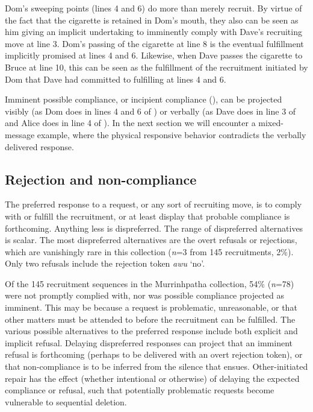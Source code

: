 \documentclass[output=paper,nonflat,colorlinks,citecolor=brown]{langsci/langscibook}
\begin{document}
Dom’s sweeping points (lines 4 and 6) do more than merely recruit. By virtue of the fact that the cigarette is retained in Dom’s mouth, they also can be seen as him giving an implicit undertaking to imminently comply with Dave’s recruiting move at line 3. %
Dom’s passing of the cigarette at line 8 is the eventual fulfillment implicitly promised at lines 4 and 6. %
Likewise, when Dave passes the cigarette to Bruce at line 10, %
this can be seen as the fulfillment of the recruitment initiated by Dom that Dave had committed to fulfilling at lines 4 and 6.

Imminent possible compliance, or incipient compliance (\citealt{Schegloff1989,kent_compliance_2012}), can be projected visibly (as Dom does in lines 4 and 6 of ) or verbally (as Dave does in line 3 of  and Alice does in line 4 of ). In the next section we will encounter a mixed-message example, where the physical responsive behavior contradicts the verbally delivered response.

\subsection{Rejection and non-compliance}\label{sec:blythe:4.2}

The preferred response to a request, or any sort of recruiting move, is to comply with or fulfill the recruitment, or at least display that probable compliance is forthcoming. Anything less is dispreferred. The range of dispreferred alternatives is scalar. The most dispreferred alternatives are the overt refusals or rejections, which are vanishingly rare in this collection (\textit{n}=3 from 145 recruitments, 2\%). Only two refusals include the rejection token \textit{awu} ‘no’.

Of the 145 recruitment sequences in the Murrinhpatha collection, 54\% (\textit{n}=78) were not promptly complied with, nor was possible compliance projected as imminent. This may be because a request is problematic, unreasonable, or that other matters must be attended to before the recruitment can be fulfilled. The various possible alternatives to the preferred response include both explicit and implicit refusal. Delaying dispreferred responses can project that an imminent refusal is forthcoming (perhaps to be delivered with an overt rejection token), or that non-compliance is to be inferred from the silence that ensues. Other-initiated repair has the effect (whether intentional or otherwise) of delaying the expected compliance or refusal, such that potentially problematic requests become vulnerable to sequential deletion.
\end{document}
